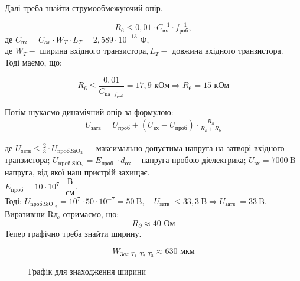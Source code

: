 \documentclass[a4paper,14pt]{extreport}
\begin{document}
	Далі треба знайти струмообмежуючий опір.

	$$
	R_{6} \leq 0,01 \cdot C_{\text{вх}}^{-1} \cdot f_{\text{роб}}^{-1},
	$$
	де $C_{\text{вх}}=C_{ox} \cdot W_{T} \cdot L_{T} = 2,589 \cdot 10^{-13}\text{ Ф},$ \\
	де $ W_{T} - \text{ ширина вхідного транзистора}, L_{T} - \text{ довжина вхідного транзистора}$.\\
	Тоді маємо, що:


	$$
	R_{6} \leq \dfrac{0,01}{C_{\text{{вх}}\cdot f_{\text{роб}}}}=17,9 \text{ кОм} \Rightarrow R_{6}=15 \text{ кОм} 
	$$


	Потім шукаємо динамічний опір за формулою:
	\begin{align}
	U_{\text{затв}}=U_{\text{проб}}+\left(U_{\text{вх}}-U_{\text{проб}}\right) \cdot \frac{R_{\partial}}{R_{\partial}+R_{6}}
	\end{align}

	де
	$
	U_{\text{затв}} \leq \frac{2}{3} \cdot U_{\text {npoб.SіO$_2$}} - 
	$
	максимально допустима напруга на затворі вхідного
	транзистора; 
	$U_{\text{npoб.SіO$_2$}}=E_{\text {проб }} \cdot d_{\text {оx }}$ - напруга пробою діелектрика; $U_{\text {вх}}=7000 \mathrm{~B}$
	напруга, від якої наш пристрій захищає. \\
	$E_{\text{npoб}} = 10 \cdot 10^{7}\text{ } \dfrac{\text{В}}{\text{см}}$. \\


	Тоді: $U_{\text {nроб.SiO }_{2}}=10^7\cdot 50\cdot 10^{-7} = 50 \mathrm{~B}, \quad U_{\text {затв }} \leq 33,3 \mathrm{~B} \Rightarrow U_{\text {затв }}=33 \mathrm{~B}$. Виразивши Rд, отримаємо, що:
	$$
	R_{\partial} \approx 40  \text{ Ом}
	$$
	Тепер графічно треба знайти ширину.

	$$
	W_{3 a x . T_{1}, T_{2}, T_{3}} \approx 630  \text{ мкм}
	$$


	\begin{figure}[h!]
	\caption{Графік для знаходження ширини}
	\label{ris2}
	\end{figure}
\end{document}

